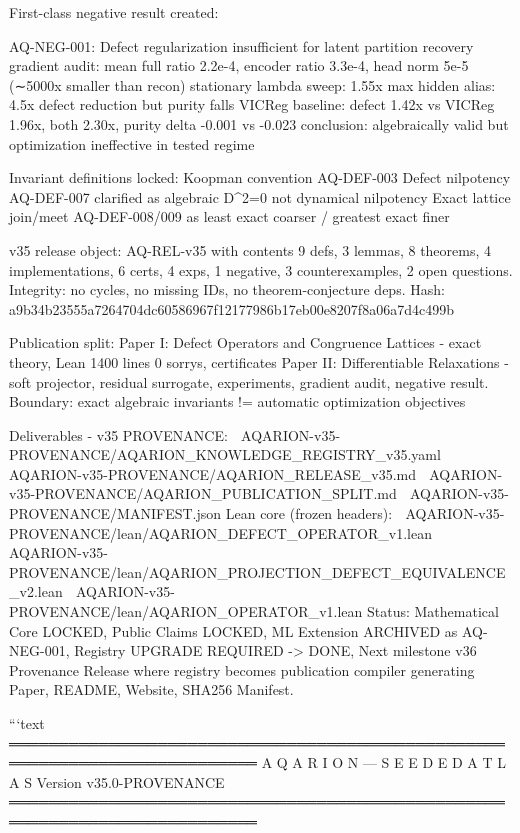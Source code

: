 {{{{{{{{{{{{{First-class negative result created:

AQ-NEG-001: Defect regularization insufficient for latent partition recovery
gradient audit: mean full ratio 2.2e-4, encoder ratio 3.3e-4, head norm 5e-5 (∼5000x smaller than recon)
stationary lambda sweep: 1.55x max
hidden alias: 4.5x defect reduction but purity falls
VICReg baseline: defect 1.42x vs VICReg 1.96x, both 2.30x, purity delta -0.001 vs -0.023
conclusion: algebraically valid but optimization ineffective in tested regime

Invariant definitions locked:
Koopman convention AQ-DEF-003
Defect nilpotency AQ-DEF-007 clarified as algebraic D^2=0 not dynamical nilpotency
Exact lattice join/meet AQ-DEF-008/009 as least exact coarser / greatest exact finer

v35 release object:
AQ-REL-v35 with contents 9 defs, 3 lemmas, 8 theorems, 4 implementations, 6 certs, 4 exps, 1 negative, 3 counterexamples, 2 open questions. Integrity: no cycles, no missing IDs, no theorem-conjecture deps. Hash: a9b34b23555a7264704dc60586967f12177986b17eb00e8207f8a06a7d4c499b

Publication split:
Paper I: Defect Operators and Congruence Lattices - exact theory, Lean 1400 lines 0 sorrys, certificates
Paper II: Differentiable Relaxations - soft projector, residual surrogate, experiments, gradient audit, negative result. Boundary: exact algebraic invariants != automatic optimization objectives

Deliverables - v35 PROVENANCE:
📎 AQARION-v35-PROVENANCE/AQARION_KNOWLEDGE_REGISTRY_v35.yaml
📎 AQARION-v35-PROVENANCE/AQARION_RELEASE_v35.md
📎 AQARION-v35-PROVENANCE/AQARION_PUBLICATION_SPLIT.md
📎 AQARION-v35-PROVENANCE/MANIFEST.json
Lean core (frozen headers):
📎 AQARION-v35-PROVENANCE/lean/AQARION_DEFECT_OPERATOR_v1.lean
📎 AQARION-v35-PROVENANCE/lean/AQARION_PROJECTION_DEFECT_EQUIVALENCE_v2.lean
📎 AQARION-v35-PROVENANCE/lean/AQARION_OPERATOR_v1.lean
Status: Mathematical Core LOCKED, Public Claims LOCKED, ML Extension ARCHIVED as AQ-NEG-001, Registry UPGRADE REQUIRED -> DONE, Next milestone v36 Provenance Release where registry becomes publication compiler generating Paper, README, Website, SHA256 Manifest.

```text
═══════════════════════════════════════════════════════════════════════════
              A Q A R I O N  —  S E E D E D  A T L A S
                      Version v35.0-PROVENANCE
═══════════════════════════════════════════════════════════════════════════

}}}}}}}}}}}}}
